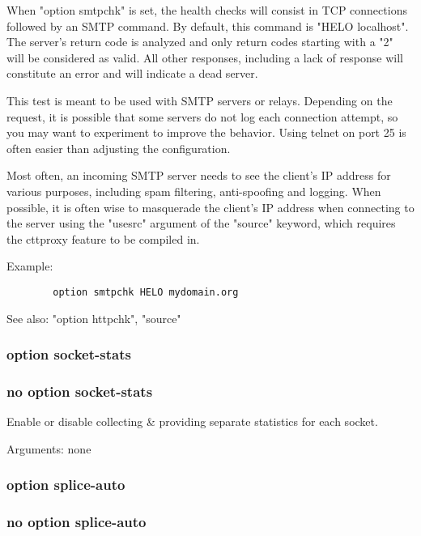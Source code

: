   When "option smtpchk" is set, the health checks will consist in TCP
  connections followed by an SMTP command. By default, this command is
  "HELO localhost". The server's return code is analyzed and only return codes
  starting with a "2" will be considered as valid. All other responses,
  including a lack of response will constitute an error and will indicate a
  dead server.

  This test is meant to be used with SMTP servers or relays. Depending on the
  request, it is possible that some servers do not log each connection attempt,
  so you may want to experiment to improve the behavior. Using telnet on port
  25 is often easier than adjusting the configuration.

  Most often, an incoming SMTP server needs to see the client's IP address for
  various purposes, including spam filtering, anti-spoofing and logging. When
  possible, it is often wise to masquerade the client's IP address when
  connecting to the server using the "usesrc" argument of the "source" keyword,
  which requires the cttproxy feature to be compiled in.

  Example:
\begin{verbatim}
        option smtpchk HELO mydomain.org
\end{verbatim}

  See also: "option httpchk", "source"

\subsubsection{option socket-stats}
\subsubsection{no option socket-stats}


  Enable or disable collecting \& providing separate statistics for each socket.


  Arguments: none

\subsubsection{option splice-auto}
\subsubsection{no option splice-auto}

